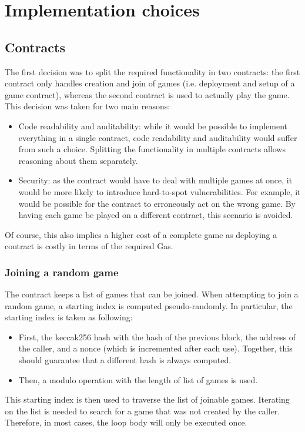 \section{Implementation choices}

\subsection{Contracts}
The first decision was to split the required functionality in two contracts:
the first contract only handles creation and join of games (i.e. deployment and
setup of a game contract), whereas the second contract is used to actually play
the game. This decision was taken for two main reasons:
\begin{itemize}
	\item Code readability and auditability: while it would be possible to implement
	      everything in a single contract, code readability and auditability would suffer
	      from such a choice. Splitting the functionality in multiple contracts allows
	      reasoning about them separately.
	\item Security: as the contract would have to deal with multiple games at once, it
	      would be more likely to introduce hard-to-spot vulnerabilities. For example, it
	      would be possible for the contract to erroneously act on the wrong game. By
	      having each game be played on a different contract, this scenario is avoided.
\end{itemize}
Of course, this also implies a higher cost of a complete game as deploying a
contract is costly in terms of the required Gas.

\subsubsection{Joining a random game}
The contract keeps a list of games that can be joined. When attempting to join
a random game, a starting index is computed pseudo-randomly. In particular, the
starting index is taken as following:
\begin{itemize}
	\item First, the keccak256 hash with the hash of the previous block, the address of
	      the caller, and a nonce (which is incremented after each use). Together, this
	      should guarantee that a different hash is always computed.
	\item Then, a modulo operation with the length of list of games is used.
\end{itemize}
This starting index is then used to traverse the list of joinable games.
Iterating on the list is needed to search for a game that was not created by
the caller. Therefore, in most cases, the loop body will only be executed once.

